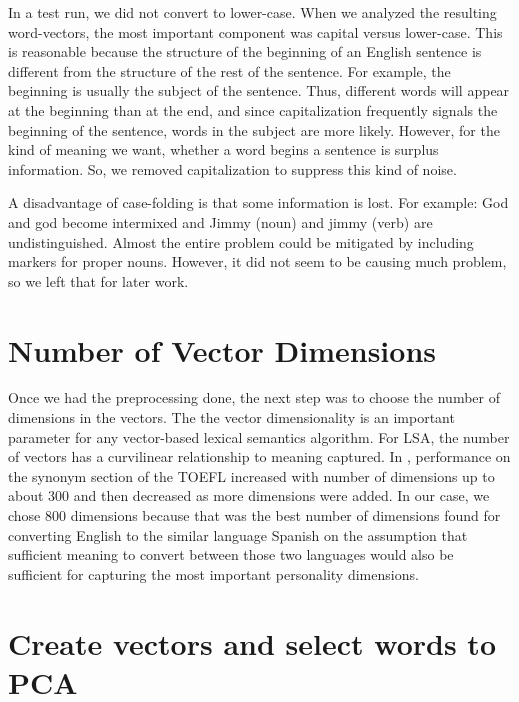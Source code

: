 \documentclass[eric_thesis.tex]{subfiles}
\begin{document}
In a test run, we did not convert to lower-case. When we analyzed the resulting 
word-vectors, the most important component was capital versus lower-case. This 
is reasonable because the structure of the beginning of an English sentence is 
different from the structure of the rest of the sentence. For example, the 
beginning is usually the subject of the sentence. Thus, different words will 
appear at the beginning than at the end, and since capitalization frequently 
signals the beginning of the sentence, words in the subject are more likely. 
However, for the kind of meaning we want, whether a word begins a sentence is 
surplus information. So, we removed capitalization to suppress this kind of 
noise.

A disadvantage of case-folding is that some information is lost. For example: 
God and god become intermixed and Jimmy (noun) and jimmy (verb) are 
undistinguished. Almost the entire problem could be mitigated by including 
markers for proper nouns. However, it did not seem to be causing much problem, 
so we left that for later work.

\section{Number of Vector Dimensions}

Once we had the preprocessing done, the next step was to choose the number of 
dimensions in the vectors. The the vector dimensionality is an important 
parameter for any vector-based lexical semantics algorithm. For LSA, the number 
of vectors has a curvilinear relationship to meaning captured. In , performance on the 
synonym section of the TOEFL  increased with number of 
dimensions up to about 300 and then decreased as more dimensions were added. In 
our case, we chose 800 dimensions because that was the best number of dimensions 
found for converting English to the similar language Spanish  on the assumption that sufficient meaning to convert between 
those two languages would also be sufficient for capturing the most important 
personality dimensions.

\section{Create vectors and select words to PCA}

\end{document}
